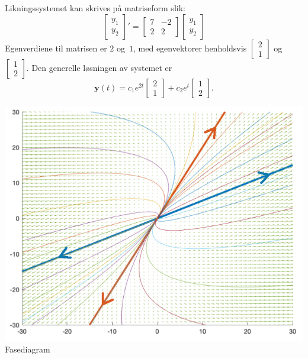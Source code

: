 \documentclass[notitlepage,a4paper,12pt,norsk]{IMFeksamen}
\newcommand{\vvS}[2]{\left[ \begin{smallmatrix} #1 \\ #2 \end{smallmatrix} \right]}
\newcommand{\0}{\V{0}}
\newcommand{\oppgslutt}{
\begin{center}
\pgfornament[width=6cm]{88}
\end{center}
}
\begin{document}
\begin{minipage}[t]{.5\textwidth}
\begin{oppgave}
Likningssystemet kan skrives på matriseform slik:
\[
\begin{bmatrix}
y_1  \\
y_2
\end{bmatrix}'
=
\begin{bmatrix}
7 & -2  \\
2 & 2 
\end{bmatrix}
\begin{bmatrix}
y_1  \\
y_2 
\end{bmatrix}
\]
Egenverdiene til matrisen er $2$ og~$1$,
med egenvektorer henholdsvis
$\vvS{2}{1}$ og~$\vvS{1}{2}$.
Den generelle løsningen av systemet er
\[
\mathbf y(t)=
c_1e^{2t}
\begin{bmatrix}
2  \\
1 
\end{bmatrix}
+ 
c_2e^{t}
\begin{bmatrix}
1  \\
2 
\end{bmatrix}.
\]
\end{oppgave}
\end{minipage}
\hfill
\begin{minipage}[t]{.4\textwidth}
\begin{center}
\includegraphics[scale=.35]{fasediagram}\\
Fasediagram
\end{center}
\end{minipage}
\vspace{-20pt}
\oppgslutt
\end{document}
